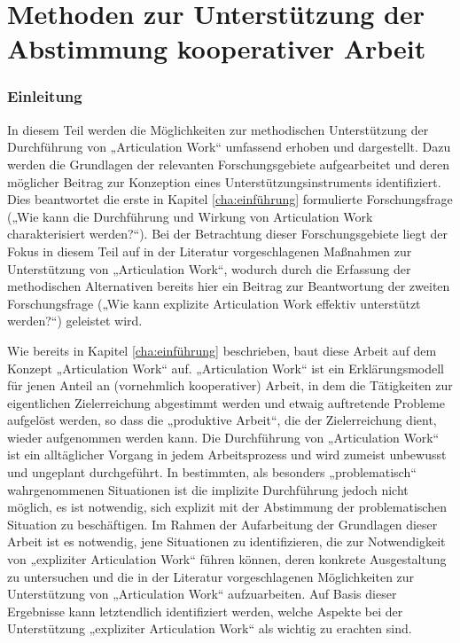 \part{Methoden zur Unterstützung der Abstimmung kooperativer Arbeit} %
\label{prt:grundlagen}

\section*{Einleitung} %
\label{sec:grundlagen_einleitung}


In diesem Teil werden die Möglichkeiten zur methodischen Unterstützung der Durchführung von „Articulation Work“ umfassend erhoben und dargestellt. Dazu werden die Grundlagen der relevanten Forschungsgebiete aufgearbeitet und deren möglicher Beitrag zur Konzeption eines Unterstützungsinstruments identifiziert. Dies beantwortet die erste in Kapitel \ref{cha:einführung} formulierte Forschungsfrage („Wie kann die Durchführung und Wirkung von Articulation Work charakterisiert werden?“). Bei der Betrachtung dieser Forschungsgebiete liegt der Fokus in diesem Teil auf in der Literatur vorgeschlagenen Maßnahmen zur Unterstützung von „Articulation Work“, wodurch durch die Erfassung der methodischen Alternativen bereits hier ein Beitrag zur Beantwortung der zweiten Forschungsfrage („Wie kann explizite Articulation Work effektiv unterstützt werden?“) geleistet wird.

Wie bereits in Kapitel \ref{cha:einführung} beschrieben, baut diese Arbeit auf dem Konzept „Articulation Work“ auf. „Articulation Work“ ist ein Erklärungsmodell für jenen Anteil an (vornehmlich kooperativer) Arbeit, in dem die Tätigkeiten zur eigentlichen Zielerreichung abgestimmt werden und etwaig auftretende Probleme aufgelöst werden, so dass die „produktive Arbeit“, die der Zielerreichung dient, wieder aufgenommen werden kann. Die Durchführung von „Articulation Work“ ist ein alltäglicher Vorgang in jedem Arbeitsprozess und wird zumeist unbewusst und ungeplant durchgeführt. In bestimmten, als besonders „problematisch“ wahrgenommenen Situationen ist die implizite Durchführung jedoch nicht  möglich, es ist notwendig, sich explizit mit der Abstimmung der problematischen Situation zu beschäftigen. Im Rahmen der Aufarbeitung der Grundlagen dieser Arbeit ist es notwendig, jene Situationen zu identifizieren, die zur Notwendigkeit von „expliziter Articulation Work“ führen können, deren konkrete Ausgestaltung zu untersuchen und die in der Literatur vorgeschlagenen Möglichkeiten zur Unterstützung von „Articulation Work“ aufzuarbeiten. Auf Basis dieser Ergebnisse kann letztendlich identifiziert werden, welche Aspekte bei der Unterstützung „expliziter Articulation Work“ als wichtig zu erachten sind.

